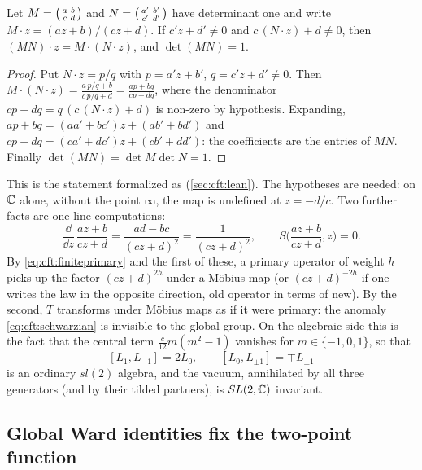 \begin{proposition}[\TA]\label{prop:cft:mobius}
Let $M=\begin{psmallmatrix}a&b\\c&d\end{psmallmatrix}$ and
$N=\begin{psmallmatrix}a'&b'\\c'&d'\end{psmallmatrix}$ have determinant one and write
$M\cdot z=(az+b)/(cz+d)$. If $c'z+d'\ne0$ and $c\,(N\cdot z)+d\ne0$, then
$(MN)\cdot z=M\cdot(N\cdot z)$, and $\det(MN)=1$.
\end{proposition}
\begin{proof}
Put $N\cdot z=p/q$ with $p=a'z+b'$, $q=c'z+d'\neq0$. Then
$M\cdot(N\cdot z)=\frac{a\,p/q+b}{c\,p/q+d}=\frac{ap+bq}{cp+dq}$, where the denominator
$cp+dq=q\,(c\,(N\cdot z)+d)$ is non-zero by hypothesis. Expanding,
$ap+bq=(aa'+bc')z+(ab'+bd')$ and $cp+dq=(ca'+dc')z+(cb'+dd')$: the coefficients are the entries
of $MN$. Finally $\det(MN)=\det M\det N=1$.
\end{proof}

This is the statement formalized as  (\cref{sec:cft:lean}). The hypotheses
are needed: on $\mathbb{C}$ alone, without the point $\infty$, the map is undefined at $z=-d/c$. Two
further facts are one-line computations:
\begin{equation}\label{eq:cft:mobiusderiv}
  \frac{\dd}{\dd z}\,\frac{az+b}{cz+d}=\frac{ad-bc}{(cz+d)^2}=\frac{1}{(cz+d)^2},
  \qquad S\Big(\frac{az+b}{cz+d},z\Big)=0 .
\end{equation}
By \eqref{eq:cft:finiteprimary} and the first of these, a primary operator of weight $h$ picks
up the factor $(cz+d)^{2h}$ under a M\"obius map (or $(cz+d)^{-2h}$ if one writes the law in the
opposite direction, old operator in terms of new). By the second, $T$ transforms under M\"obius
maps as if it were primary: the anomaly \eqref{eq:cft:schwarzian} is invisible to the global
group. On the algebraic side this is the fact that the central term $\frac c{12}m(m^2-1)$
vanishes for $m\in\{-1,0,1\}$, so that
\begin{equation}\label{eq:cft:sl2alg}
  [L_1,L_{-1}]=2L_0,\qquad[L_0,L_{\pm1}]=\mp L_{\pm1}
\end{equation}
is an ordinary $sl(2)$ algebra, and the vacuum, annihilated by all three generators (and by their
tilded partners), is $SL(2,\mathbb{C})$ invariant.

\subsection{Global Ward identities fix the two-point function}\label{sec:cft:twopoint}

